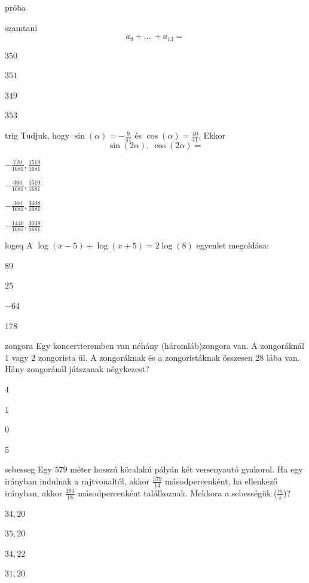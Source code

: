 \documentclass[12pt]{article}
\begin{document}
\begin{quiz}{próba}
\begin{multi}{szamtani}
$$
a_{9}+{...\:} +a_{13}=
$$
\item* $350$
\item  $351$
\item  $349$
\item  $353$
\end{multi}
\begin{multi}{trig}
Tudjuk, hogy $ \sin(\alpha) =-\frac{9}{41}$ és $ \cos(\alpha) = \frac{40}{41} $. 
Ekkor $$ \sin(2\alpha),\ \cos(2\alpha)=$$
\item* $ -\frac{720}{1681}, \frac{1519}{1681} $
\item  $ -\frac{360}{1681}, \frac{1519}{1681} $
\item  $ -\frac{360}{1681}, \frac{3038}{1681} $
\item  $ -\frac{1440}{1681}, \frac{3038}{1681} $
\end{multi}
\begin{multi}{logeq}
A $ \log(x-5)+\log(x+5)=2\log(8) $ egyenlet megoldása:
\item* $ 89  $
\item  $ 25 $
\item  $ -64 $
\item  $ 178 $
\end{multi}
\begin{multi}{zongora}
Egy koncertteremben van néhány (háromláb)zongora van. A zongoráknál 
$1$ vagy $2$ zongorista ül. A zongoráknak és a zongoristáknak összesen $28$ 
lába van. Hány zongoránál játszanak négykezest?
\item* $ 4  $
\item  $ 1 $
\item  $ 0 $
\item  $ 5 $
\end{multi}
\begin{multi}{sebesseg}
Egy $579$ méter hosszú köralakú pályán két versenyautó gyakorol. Ha egy irányban 
indulnak a rajtvonaltól, akkor $\frac{579}{14}$ másodpercenként, ha ellenkező irányban, akkor 
$\frac{193}{18}$ másodpercenként találkoznak. Mekkora a sebességük ($\frac{m}{s}$)?
\item* $ 34, 20  $
\item  $ 35, 20 $
\item  $ 34, 22 $
\item  $ 31, 20 $
\end{multi}
\end{quiz}
\end{document}
